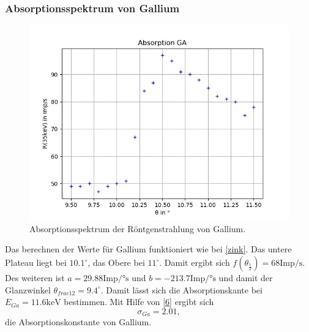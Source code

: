 \subsubsection*{Absorptionsspektrum von Gallium}
\begin{figure}[H]
  \centering
  \includegraphics{content/Ga.png}
  \caption{Absorptionsspektrum der Röntgenstrahlung von Gallium.}
  \label{fig:ga}
\end{figure}
Das berechnen der Werte für Gallium funktioniert wie bei \autoref{zink}. Das untere Plateau liegt bei $10.1^\circ$, das Obere bei $11^\circ$. Damit ergibt sich $f(\theta_{\frac{1}{2}})=68 \textrm{Imp/s}$. Des weiteren ist $a=29.88 \textrm{Imp/°s}$ und $b=-213.7 \textrm{Imp/°s}$ und damit der Glanzwinkel $\theta_{frac{1}{2}}=9.4^\circ$. Damit lässt sich die Absorptionskante bei $E_{Ga}=11.6 \textrm{keV}$ bestimmen. Mit Hilfe von \eqref{6} ergibt sich 
\begin{equation*}
  \sigma_{Ga}=2.01,
\end{equation*}
die Absorptionskonstante von Gallium.

